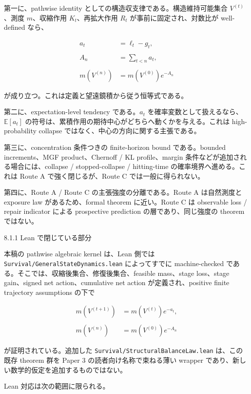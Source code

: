 \documentclass[12pt,a4paper]{article}
\begin{document}
第一に、pathwise identity としての構造収支律である。構造維持可能集合 \(V^{(t)}\)、測度 \(m\)、収縮作用 \(K_{t}\)、再拡大作用 \(R_{t}\) が事前に固定され、対数比が well-defined なら、

\[
\begin{aligned}
a_{t}&=\ell_{t}-g_{t}, \\
\qquad \\
A_{n}&=\sum_{t<n}a_{t}, \\
\qquad \\
m(V^{(n)})&=m(V^{(0)})e^{-A_{n}}
\end{aligned}
\]

が成り立つ。これは定義と望遠鏡積から従う恒等式である。

第二に、expectation-level tendency である。\(a_{t}\) を確率変数として扱えるなら、\(\mathbb E[a_{t}]\) の符号は、累積作用の期待中心がどちらへ動くかを与える。これは high-probability collapse ではなく、中心の方向に関する主張である。

第三に、concentration 条件つきの finite-horizon bound である。bounded increments、MGF product、Chernoff / KL profile、margin 条件などが追加される場合には、collapse / stopped-collapse / hitting-time の確率境界へ進める。これは Route A で強く閉じるが、Route C では一般に得られない。

第四に、Route A / Route C の主張強度の分離である。Route A は自然測度と exposure law があるため、formal theorem に近い。Route C は observable loss / repair indicator による prospective prediction の層であり、同じ強度の theorem ではない。

8.1.1 Lean で閉じている部分

本稿の pathwise algebraic kernel は、Lean 側では \texttt{Survival/GeneralStateDynamics.lean} によってすでに machine-checked である。そこでは、収縮後集合、修復後集合、feasible mass、stage loss、stage gain、signed net action、cumulative net action が定義され、positive finite trajectory assumptions の下で

\[
\begin{aligned}
m(V^{(t+1)})&=m(V^{(t)})e^{-a_{t}}, \\
\qquad \\
m(V^{(n)})&=m(V^{(0)})e^{-A_{n}}
\end{aligned}
\]

が証明されている。追加した \texttt{Survival/StructuralBalanceLaw.lean} は、この既存 theorem 群を Paper 3 の読者向け名称で束ねる薄い wrapper であり、新しい数学的仮定を追加するものではない。

Lean 対応は次の範囲に限られる。
\end{document}

